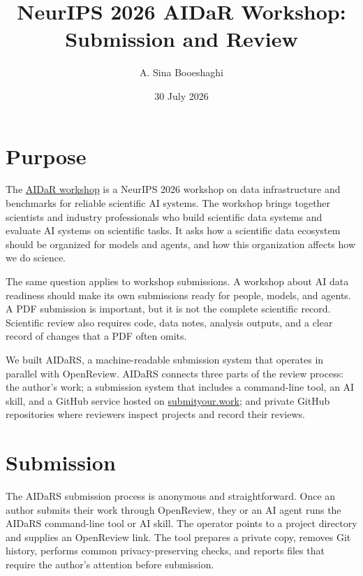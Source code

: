 \documentclass[10pt]{article}
\title{\vspace{-3em}NeurIPS 2026 AIDaR Workshop: Submission and Review}
\author{A. Sina Booeshaghi}
\date{30 July 2026}
\newcommand{\systemurl}{\href{https://submityour.work}{submityour.work}}
\newcommand{\workshopurl}{\href{https://aidar-workshop.github.io/2026/}{AIDaR workshop}}
\begin{document}
\maketitle
\begin{center}
\end{center}

\section{Purpose}

The \workshopurl{} is a NeurIPS 2026 workshop on data infrastructure and
benchmarks for reliable scientific AI systems. The workshop brings together
scientists and industry professionals who build scientific data systems and
evaluate AI systems on scientific tasks. It asks how a scientific data
ecosystem should be organized for models and agents, and how this organization
affects how we do science.

The same question applies to workshop submissions. A workshop about AI data
readiness should make its own submissions ready for people, models, and agents.
A PDF submission is important, but it is not the complete scientific record.
Scientific review also requires code, data notes, analysis outputs, and a clear
record of changes that a PDF often omits.

We built AIDaRS, a machine-readable submission system that operates in parallel
with OpenReview. AIDaRS connects three parts of the review process: the author's
work; a submission system that includes a command-line tool, an AI skill, and a
GitHub service hosted on \systemurl{}; and private GitHub repositories where
reviewers inspect projects and record their reviews.

\section{Submission}

The AIDaRS submission process is anonymous and straightforward. Once an author
submits their work through OpenReview, they or an AI agent runs the AIDaRS
command-line tool or AI skill. The operator points to a project directory and
supplies an OpenReview link. The tool prepares a private copy,
removes Git history, performs common privacy-preserving checks, and
reports files that require the author's attention before submission.
\end{document}
